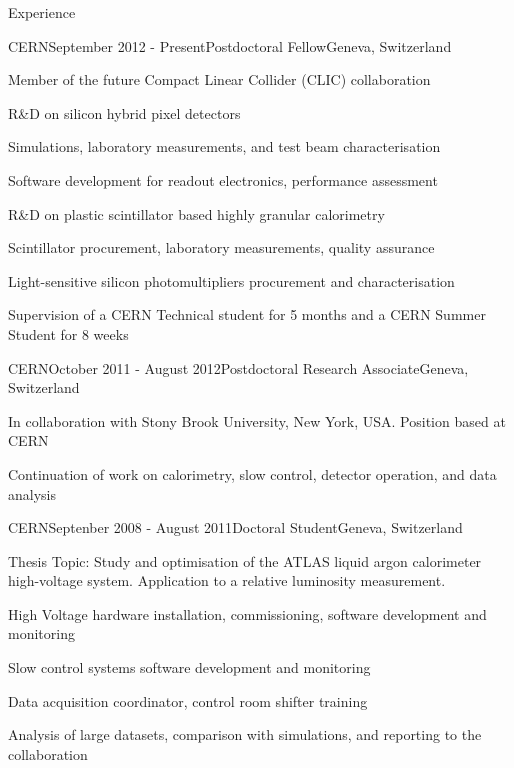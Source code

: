\documentclass{resume} %
\begin{document}
\begin{rSection}{Experience}

\begin{rSubsection}{CERN}{September 2012 - Present}{Postdoctoral Fellow}{Geneva, Switzerland}
\item Member of the future Compact Linear Collider (CLIC) collaboration
\item R\&D on silicon hybrid pixel detectors
	{\setlength\itemindent{25pt} \item 
	Simulations, laboratory measurements, and test beam characterisation}
	{\setlength\itemindent{25pt} \item 
	Software development for readout electronics, performance assessment}
\item R\&D on plastic scintillator based highly granular calorimetry
	{\setlength\itemindent{25pt} \item 
	Scintillator procurement, laboratory measurements, quality assurance}
	{\setlength\itemindent{25pt} \item 
	Light-sensitive silicon photomultipliers procurement and characterisation}
\item Supervision of a CERN Technical student for 5 months and a CERN Summer Student for 8 weeks
\end{rSubsection}


\begin{rSubsection}{CERN}{October 2011 - August 2012}{Postdoctoral Research Associate}{Geneva, Switzerland}
\item In collaboration with Stony Brook University, New York, USA. Position based at CERN
\item Continuation of work on calorimetry, slow control, detector operation, and data analysis
\end{rSubsection}


\begin{rSubsection}{CERN}{Septenber 2008 - August 2011}{Doctoral Student}{Geneva, Switzerland}
\item Thesis Topic: Study and optimisation of the ATLAS liquid argon calorimeter high-voltage
system. Application to a relative luminosity measurement.
\item High Voltage hardware installation, commissioning, software development and monitoring
\item Slow control systems software development and monitoring
\item Data acquisition coordinator, control room shifter training
\item Analysis of large datasets, comparison with simulations, and reporting to the collaboration
\end{rSubsection}

\end{rSection}
\end{document}
